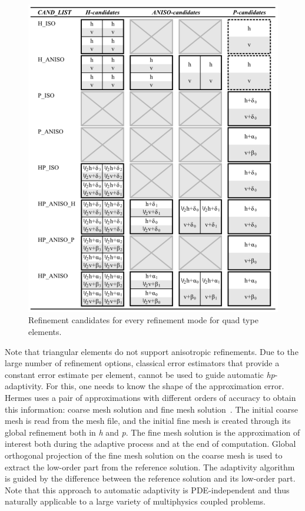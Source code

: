 \begin{figure}[!ht]
  \begin{centering}
  \includegraphics[width=0.8\columnwidth]{cand_list_quads}
  \caption{\label{fig:candlist} Refinement candidates for every
  refinement mode for quad type elements.}
  \end{centering}
\end{figure}
Note that triangular elements do not support anisotropic refinements.
Due to the large number of refinement options, classical error estimators 
that provide a constant error estimate per element, cannot be used to 
guide automatic \emph{hp}-adaptivity. 
For this, one needs to know the shape of the approximation error.
Hermes uses a pair of approximations with different orders of accuracy 
to obtain this information: coarse mesh solution and fine mesh solution~\cite{solin2010pde}. 
The initial coarse mesh is read from the mesh file, and the initial 
fine mesh is created through its global refinement both in \emph{h}
and \emph{p}. The fine mesh solution is the approximation of 
interest both during the adaptive process and at the end of computation. 
Global orthogonal projection of the fine mesh solution on the coarse mesh 
is used to extract the low-order part from the reference solution.
The adaptivity algorithm is guided by the difference between the 
reference solution and its low-order part.
Note that this approach to automatic adaptivity is PDE-independent
and thus naturally applicable to a large variety of multiphysics 
coupled problems.

